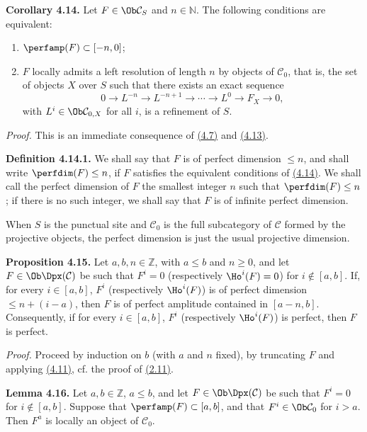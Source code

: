 \textbf{Corollary 4.14.} Let \(F\in\Ob\mathcal C_S\) and \(n\in\mathbb N\). The following conditions are equivalent:
\begin{enumerate}[label=(\roman*)]
\item \(\perfamp(F)\subset[-n,0]\);
\item \(F\) locally admits a left resolution of length \(n\) by objects of \(\mathcal C_0\), that is, the set of objects \(X\) over \(S\) such that there exists an exact sequence
\[
  0\longrightarrow L^{-n}\longrightarrow L^{-n+1}\longrightarrow \cdots
  \longrightarrow L^0\longrightarrow F_X\longrightarrow 0,
\]
with \(L^i\in\Ob\mathcal C_{0,X}\) for all \(i\), is a refinement of \(S\).
\end{enumerate}

\emph{Proof.} This is an immediate consequence of \hyperlink{sga6.e01.def.4-7}{(4.7)} and \hyperlink{sga6.e01.lem.4-13}{(4.13)}.

\textbf{Definition 4.14.1.} We shall say that \(F\) is of perfect dimension \(\leq n\), and shall write \(\perfdim(F)\leq n\), if \(F\) satisfies the equivalent conditions of \hyperlink{sga6.e01.cor.4-14}{(4.14)}. We shall call the perfect dimension of \(F\) the smallest integer \(n\) such that \(\perfdim(F)\leq n\); if there is no such integer, we shall say that \(F\) is of infinite perfect dimension.

When \(S\) is the punctual site and \(\mathcal C_0\) is the full subcategory of \(\mathcal C\) formed by the projective objects, the perfect dimension is just the usual projective dimension.

\textbf{Proposition 4.15.} Let \(a,b,n\in\mathbb Z\), with \(a\leq b\) and \(n\geq0\), and let \(F\in\Ob\Dpx(\mathcal C)\) be such that \(F^i=0\) (respectively \(\Ho^i(F)=0\)) for \(i\notin[a,b]\). If, for every \(i\in[a,b]\), \(F^i\) (respectively \(\Ho^i(F)\)) is of perfect dimension \(\leq n+(i-a)\), then \(F\) is of perfect amplitude contained in \([a-n,b]\). Consequently, if for every \(i\in[a,b]\), \(F^i\) (respectively \(\Ho^i(F)\)) is perfect, then \(F\) is perfect.

\emph{Proof.} Proceed by induction on \(b\) (with \(a\) and \(n\) fixed), by truncating \(F\) and applying \hyperlink{sga6.e01.complement.4-11}{(4.11)}, cf. the proof of \hyperlink{sga6.e01.prop.2-11}{(2.11)}.

\textbf{Lemma 4.16.} Let \(a,b\in\mathbb Z\), \(a\leq b\), and let \(F\in\Ob\Dpx(\mathcal C)\) be such that \(F^i=0\) for \(i\notin[a,b]\). Suppose that \(\perfamp(F)\subset[a,b]\), and that \(F^i\in\Ob\mathcal C_0\) for \(i>a\). Then \(F^a\) is locally an object of \(\mathcal C_0\).

